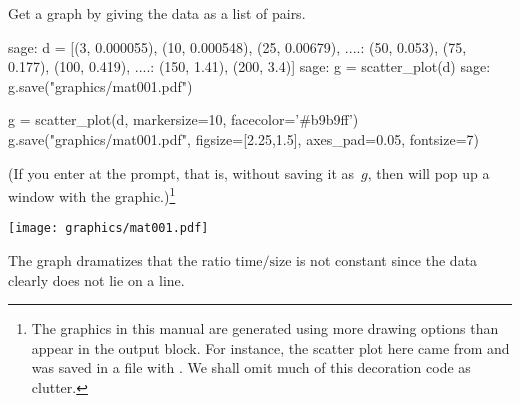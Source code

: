 Get a graph by giving \Sage{} the data as a list of pairs.
\begin{sagecommandline}
sage: d = [(3, 0.000055), (10, 0.000548), (25, 0.00679),  
....:      (50, 0.053), (75, 0.177), (100, 0.419), 
....:      (150, 1.41), (200, 3.4)]
sage: g = scatter_plot(d)  
sage: g.save("graphics/mat001.pdf")            
\end{sagecommandline}
\begin{sagesilent}
g = scatter_plot(d, markersize=10, facecolor='#b9b9ff')
g.save("graphics/mat001.pdf", figsize=[2.25,1.5], axes_pad=0.05, fontsize=7)
\end{sagesilent}
(If you enter  at the prompt, that is, 
without saving it as~$g$, then \Sage{} will pop up a window with the
graphic.)\footnote{%
  The graphics in this manual are generated using 
  more drawing options than appear in the output block.
  For instance, the scatter plot here came from
  \protect{}
  and was saved in a file with
  \protect{}.
  We shall omit much of this decoration code as clutter.}
\begin{center}
  \texttt{[image: graphics/mat001.pdf]}
\end{center}
The graph dramatizes that the ratio $\text{time}/\text{size}$
is not constant
since the data clearly does not lie on a line.

